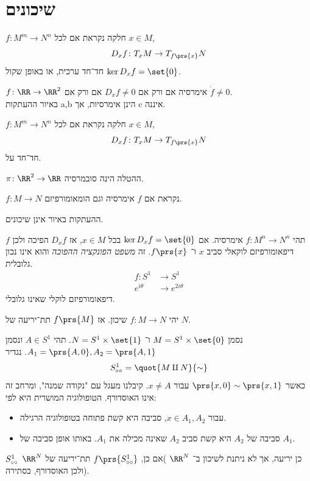 \documentclass[a4paper,10pt,twoside,openany]{book}
\begin{document}
\section{שיכונים}
\begin{definition}
$f \colon M^m \to N^n$
חלקה נקראת
אם לכל
$x \in M$,
\[D_x f \colon T_x M \to T_{f\prs{x}} N \]
חד־חד ערכית, או באופן שקול
$\ker D_x f = \set{0}$.
\end{definition}
\begin{example}
$f \colon \RR \to \RR^2$
אימרסיה אם ורק אם
$D_x f \neq 0$
אם ורק אם
$\dot{f} \neq 0$.\\
באיור
ההעתקות
\textenglish{a,b}
הינן אימרסיות, אך
\textenglish{c}
איננה.
\end{example}
\begin{definition}
$f \colon M^m \to N^n$
חלקה נקראת
אם לכל
$x \in M$,
\[D_x f \colon T_x M \to T_{f\prs{x}} N \]
חד־חד על.
\end{definition}
\begin{example}
$\pi \colon \RR^2 \to \RR$
ההטלה הינה סובמרסיה.
\end{example}
\begin{definition}
$f \colon M \to N$
נקראת
אם
$f$
אימרסיה וגם הומאומורפיזם.
\end{definition}
\begin{example}
ההעתקות באיור
אינן שיכונים.
\end{example}
\begin{remark}
תהי
$f \colon M^n \to N^n$
אימרסיה.
אם
$\ker D_x f = \set{0}$
בכל
$x \in M$,
אז
$D_x f$
הפיכה ולכן
$f$
דיפאומורפיזם לוקאלי סביב
$x$
ו־%
$f\prs{x}$.
זה
\emph{משפט הפונקציה ההפוכה}
והוא אינו נכון גלובלית.
\begin{align*}
f \colon S^1 &\to S^1 \\
e^{i\theta} &\to e^{2i\theta}
\end{align*}
דיפאומורפיזם לוקלי שאינו גלובלי.
\end{remark}
\begin{exercise}[קשה]
יהי
$f \colon M \to N$
שיכון. אז
$f\prs{M}$
תת־יריעה של
$N$.
\end{exercise}
\begin{example}
נסמן
$M = S^1 \times \set{0}$
ו־%
$N = S^1 \times \set{1}$.
תהי
$A \in S^1$
ונסמן
$A_1 = \prs{A, 0}, A_2 = \prs{A, 1}$.
נגדיר
\begin{align*}
S^1_{\tiny{\circ \circ}} = \quot{M \amalg N}{\sim}
\end{align*}
כאשר
$\prs{x,0} \sim \prs{x,1}$
עבור
$x \neq A$.
קיבלנו מעגל עם "נקודה שמנה", ומרחב זה אינו האוסדורף.
הטופולוגיה המושרית היא לפי:
\begin{itemize}
\item עבור
$x \in A_1, A_2$,
סביבה היא קשת פתוחה בטופולוגיה הרגילה.
\item סביבה של
$A_2$
היא קשת סביב
$A_2$
שאינה מכילה את
$A_1$.
באותו אופן סביבה של
$A_1$.
\end{itemize}
$S^1_{\tiny{\circ \circ}}$
כן יריעה, אך לא ניתנת לשיכון ב־%
$\RR^N$
)אם כן,
$f\prs{S^1_{\tiny{\circ \circ}}}$
תת־יריעה של
$\RR^N$
ולכן האוסדורף, בסתירה).
\end{example}
\end{document}
